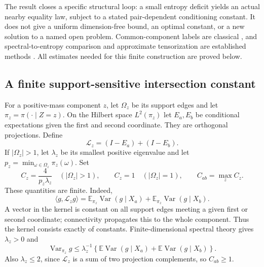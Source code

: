\documentclass[11pt,a4paper]{article}
\theoremstyle{definition}\newtheorem{definition}[theorem]{Definition}
\theoremstyle{remark}\newtheorem{remark}[theorem]{Remark}
\newcommand{\E}{\mathbb E}\newcommand{\one}{\mathbf 1}\newcommand{\1}{\mathbf 1}
\numberwithin{equation}{section}
\begin{document}
The result closes a specific structural loop: a small entropy deficit yields an actual nearby equality law, subject to a stated pair-dependent conditioning constant. It does not give a uniform dimension-free bound, an optimal constant, or a new solution to a named open problem. Common-component labels are classical \cite{ref077}, and spectral-to-entropy comparison and approximate tensorization are established methods \cite{ref078,ref079}. All estimates needed for this finite construction are proved below.

\subsection{A finite support-sensitive intersection constant}\label{R10-sec-2}\label{R10-spectralsection}
For a positive-mass component $z$, let $\Omega_z$ be its support edges and let $\pi_z=\pi(\cdot\mid Z=z)$. On the Hilbert space $L^2(\pi_z)$ let $E_a,E_b$ be conditional expectations given the first and second coordinate. They are orthogonal projections. Define
\[
 \mathcal L_z=(I-E_a)+(I-E_b).
\]
If $|\Omega_z|>1$, let $\lambda_z$ be its smallest positive eigenvalue and let $p_z=\min_{\omega\in\Omega_z}\pi_z(\omega)$. Set
\begin{equation}\label{R10-Cdef}
 C_z=\frac{4}{p_z\lambda_z}\quad(|\Omega_z|>1),\qquad
 C_z=1\quad(|\Omega_z|=1),\qquad C_{ab}=\max_zC_z.
\end{equation}
These quantities are finite. Indeed,
\[
 \langle g,\mathcal L_zg\rangle
 =\E_{\pi_z}\operatorname{Var}(g\mid X_a)
 +\E_{\pi_z}\operatorname{Var}(g\mid X_b).
\]
A vector in the kernel is constant on all support edges meeting a given first or second coordinate; connectivity propagates this to the whole component. Thus the kernel consists exactly of constants. Finite-dimensional spectral theory gives $\lambda_z>0$ and
\begin{equation}\label{R10-Poincare}
 \operatorname{Var}_{\pi_z}g\le\lambda_z^{-1}
 \left\{\E\operatorname{Var}(g\mid X_a)+\E\operatorname{Var}(g\mid X_b)\right\}.
\end{equation}
Also $\lambda_z\le2$, since $\mathcal L_z$ is a sum of two projection complements, so $C_{ab}\ge1$.
\end{document}
